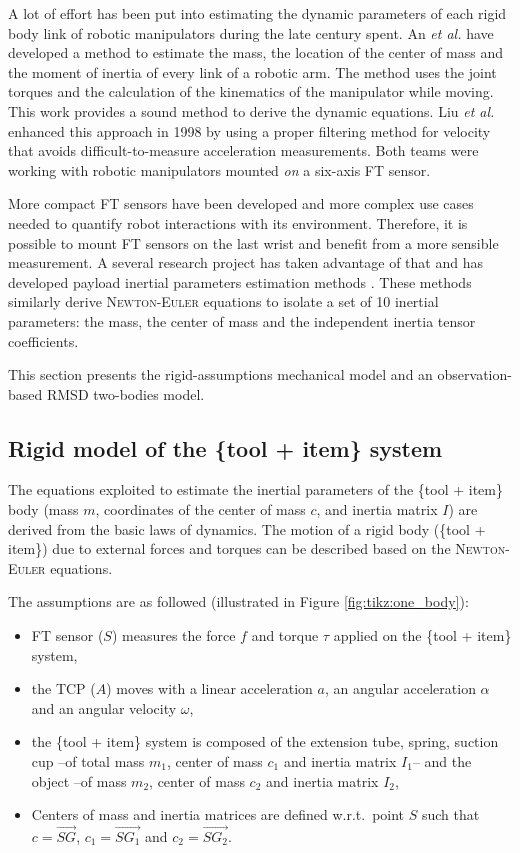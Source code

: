\documentclass[/home/francois/latex/report/main.tex]{subfiles}
\begin{document}
A lot of effort has been put into estimating the dynamic parameters of each rigid body link of robotic manipulators during the late century spent. An \textit{et al.} \cite{An1985} have developed a method to estimate the mass, the location of the center of mass and the moment of inertia of every link of a robotic arm. The method uses the joint torques and the calculation of the kinematics of the manipulator while moving. This work provides a sound method to derive the dynamic equations. Liu \textit{et al.} enhanced this approach in 1998 \cite{Liu1998} by using a proper filtering method for velocity that avoids difficult-to-measure acceleration measurements. Both teams were working with robotic manipulators mounted \textit{on} a six-axis \ac{FT} sensor.

More compact \ac{FT} sensors have been developed and more complex use cases needed to quantify robot interactions with its environment. Therefore, it is possible to mount \ac{FT} sensors on the last wrist and benefit from a more sensible measurement. A several research project has taken advantage of that and has developed payload inertial parameters estimation methods \cite{Kubus2008, Kubus2007, Kubus2014, Farsoni2018}. These methods similarly derive \textsc{Newton-Euler} equations to isolate a set of 10 inertial parameters: the mass, the center of mass and the independent inertia tensor coefficients.

This section presents the rigid-assumptions mechanical model and an observation-based \ac{RMSD} two-bodies model.

\subsection{Rigid model of the \{tool + item\} system}
\label{section:background:rigid}

The equations exploited to estimate the inertial parameters of the \{tool + item\} body (mass $m$, coordinates of the center of mass $c$, and inertia matrix $I$) are derived from the basic laws of dynamics. The motion of a rigid body (\{tool + item\}) due to external forces and torques can be described based on the \textsc{Newton-Euler} equations.

The assumptions are as followed (illustrated in Figure \ref{fig:tikz:one_body}):

\begin{itemize}
 \item \ac{FT} sensor ($S$) measures the force $f$ and torque $\tau$ applied on the \{tool + item\} system,
 \item the \ac{TCP} ($A$) moves with a linear acceleration $a$, an angular acceleration $\alpha$ and an angular velocity $\omega$,
 \item the \{tool + item\} system is composed of the extension tube, spring, suction cup –of total mass $m_1$, center of mass $c_1$ and inertia matrix $I_1$– and the object –of mass $m_2$, center of mass $c_2$ and inertia matrix $I_2$,
 \item Centers of mass and inertia matrices are defined w.r.t.\ point $S$ such that $c = \overrightarrow{SG}$, $c_1 = \overrightarrow{SG_1}$ and $c_2 = \overrightarrow{SG_2}$.
\end{itemize}
\end{document}
